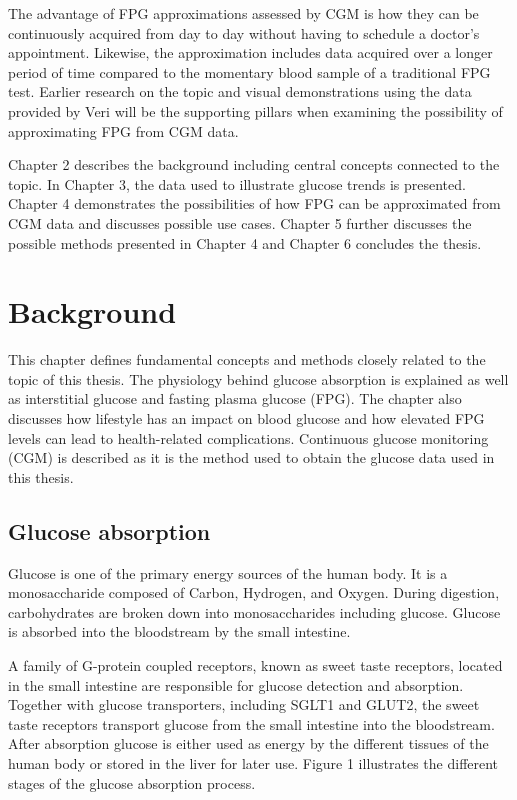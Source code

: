 \documentclass[english, 12pt, a4paper, elec, utf8, a-1b, online]{aaltothesis}
\begin{document}
The advantage of FPG approximations assessed by CGM is how they can be continuously acquired 
from day to day without having to schedule a doctor's appointment. Likewise, the approximation includes data 
acquired over a longer period of time compared to the momentary blood sample of a traditional FPG test. 
Earlier research on the topic and visual demonstrations using the data provided by Veri will
be the supporting pillars when examining the possibility of approximating FPG from CGM data. 


Chapter 2 describes the background including central concepts connected to the topic. In Chapter 3, the data used to illustrate
glucose trends is presented. Chapter 4 demonstrates the possibilities of how FPG can be approximated from CGM data and discusses 
possible use cases. Chapter 5 further discusses the possible methods presented in Chapter 4 and Chapter 6 concludes the thesis. 
\clearpage


\section{Background}
This chapter defines fundamental concepts and methods closely related to the topic 
of this thesis. The physiology behind glucose absorption is explained as well as interstitial glucose and fasting plasma glucose (FPG). The chapter also discusses how 
lifestyle has an impact on blood glucose and how elevated FPG levels can lead to health-related complications. 
Continuous glucose monitoring (CGM) is described as it is the method used to obtain the glucose data used in this thesis.

\subsection{Glucose absorption}
Glucose is one of the primary energy sources of the human body. It is a monosaccharide composed of Carbon, Hydrogen, and Oxygen. During digestion, carbohydrates are broken down into monosaccharides including glucose. Glucose is absorbed into the bloodstream by the small intestine\cite{glucose_absorption}. 

A family of G-protein coupled receptors, known as sweet taste receptors, located in the 
small intestine are responsible for glucose detection and absorption. Together with glucose transporters, including SGLT1 and 
GLUT2, the sweet taste receptors transport glucose from the small intestine into the bloodstream. 
After absorption glucose is either used as energy by the different tissues of the human body or stored in the liver for later use\cite{glucose_absorption}. Figure 1 illustrates 
the different stages of the glucose absorption process.
\end{document}
